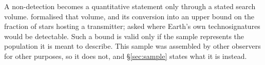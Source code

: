 A non-detection becomes a quantitative statement only through a stated
search volume. \citet{Wright2018} formalised that volume, and
\citet{Margot2023} its conversion into an upper bound on the fraction of
stars hosting a transmitter; \citet{EarthDetectingEarth2025} asked where
Earth's own technosignatures would be detectable. Such a bound is valid
only if the sample represents the population it is meant to describe.
This sample was assembled by other observers for other purposes, so it
does not, and \S\ref{sec:sample} states what it is instead.

